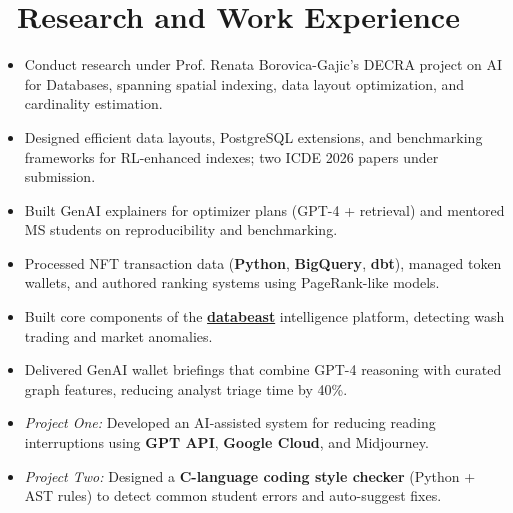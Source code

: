 \documentclass{resume}
\begin{document}
\section{\faUsers\ \textbf{Research and Work Experience}}
\begin{itemize}[parsep=0.35ex]
  \item Conduct research under Prof. Renata Borovica-Gajic’s DECRA project on AI for Databases, spanning spatial indexing, data layout optimization, and cardinality estimation.
  \item Designed efficient data layouts, PostgreSQL extensions, and benchmarking frameworks for RL-enhanced indexes; two ICDE 2026 papers under submission.
  \item Built GenAI explainers for optimizer plans (GPT-4 + retrieval) and mentored MS students on reproducibility and benchmarking.
\end{itemize}

\begin{itemize}[parsep=0.35ex]
  \item Processed NFT transaction data (\textbf{Python}, \textbf{BigQuery}, \textbf{dbt}), managed token wallets, and authored ranking systems using PageRank-like models.
  \item Built core components of the \href{https://databeast.xyz/}{\textbf{databeast}} intelligence platform, detecting wash trading and market anomalies.
  \item Delivered GenAI wallet briefings that combine GPT-4 reasoning with curated graph features, reducing analyst triage time by 40\%.
\end{itemize}

\begin{itemize}[parsep=0.35ex]
  \item \textit{Project One:} Developed an AI-assisted system for reducing reading interruptions using \textbf{GPT API}, \textbf{Google Cloud}, and Midjourney.
  \item \textit{Project Two:} Designed a \textbf{C-language coding style checker} (Python + AST rules) to detect common student errors and auto-suggest fixes.
\end{itemize}
\end{document}
